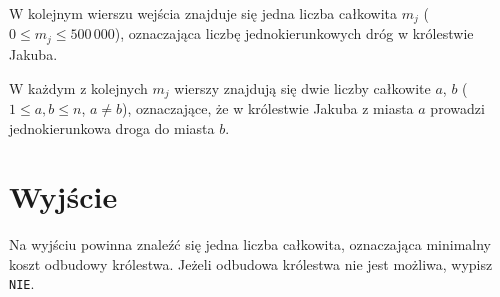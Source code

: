 \documentclass[zad,zawodnik,utf8]{sinol}
\begin{document}
\begin{tasktext}
W kolejnym wierszu wejścia znajduje się jedna liczba całkowita $m_j$ ($0 \leq m_j \leq 500\,000$), oznaczająca liczbę jednokierunkowych
dróg w królestwie Jakuba.

W każdym z kolejnych $m_j$ wierszy znajdują się dwie liczby całkowite $a$, $b$ ($1 \leq a, b \leq n$, $a \neq b$), oznaczające,
że w królestwie Jakuba z miasta $a$ prowadzi jednokierunkowa droga do miasta $b$.

  \section{Wyjście}
Na wyjściu powinna znaleźć się jedna liczba całkowita, oznaczająca minimalny koszt odbudowy królestwa.
Jeżeli odbudowa królestwa nie jest możliwa, wypisz \texttt{NIE}.

\makecompactexample

\end{tasktext}
\end{document}
